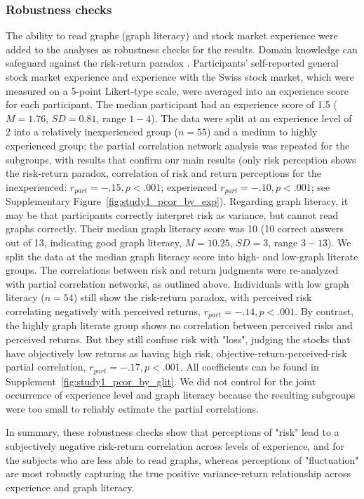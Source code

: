 \documentclass[a4paper,man, natbib,floatsintext]{apa6} %
\begin{document}
\subsubsection{Robustness checks}
 The ability to read graphs (graph literacy) and stock market experience were added to the analyses as robustness checks for the results. Domain knowledge can safeguard against the risk-return paradox \citep[e.g.,][]{Fleming2012}. Participants' self-reported general stock market experience and experience with the Swiss stock market, which were measured on a 5-point Likert-type scale, were averaged into an experience score for each participant. The median participant had an experience score of 1.5 ($M=1.76$, $SD=0.81$, range $1-4$). The data were split at an experience level of 2 into a relatively inexperienced group ($n=55$) and a medium to highly experienced group; the partial correlation network analysis was repeated for the subgroups, with results that confirm our main results (only risk perception shows the risk-return paradox, correlation of risk and return perceptions for the inexperienced: $r_{part}=-.15, p < .001$; experienced $r_{part}=-.10, p < .001$; see  Supplementary Figure~\ref{fig:study1_pcor_by_exp}). Regarding graph literacy, it may be that participants correctly interpret risk as variance, but cannot read graphs correctly. Their median graph literacy score was 10 (10 correct answers out of 13, indicating good graph literacy, $M=10.25$, $SD=3$, range $3-13$). We split the data at the median graph literacy score into high- and low-graph literate groups. The correlations between risk and return judgments were re-analyzed with partial correlation networks, as outlined above. Individuals with low graph literacy ($n=54$) still show the risk-return paradox, with perceived risk correlating negatively with perceived returns, $r_{part} = -.14, p  <  .001$. By contrast, the highly graph literate group shows no correlation between perceived risks and perceived returns. But they still confuse risk with "loss", judging the stocks that have objectively low returns as having high risk, objective-return-perceived-risk partial correlation, $r_{part}=-.17, p < .001$. All coefficients can be found in Supplement~\ref{fig:study1_pcor_by_glit}. We did not control for the joint occurrence of experience level and graph literacy because the resulting subgroups were too small to reliably estimate the partial correlations.

In summary, these robustness checks show that perceptions of "risk" lead to a subjectively negative risk-return correlation across levels of experience, and for the subjects who are less able to read graphs, whereas perceptions of "fluctuation" are most robustly capturing the true positive variance-return relationship across experience and graph literacy. 
\end{document}
